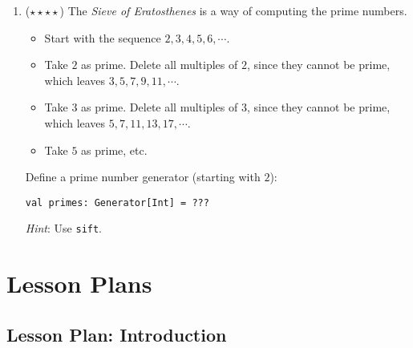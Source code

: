 \documentclass[9pt]{extbook}
\begin{document}
\begin{enumerate}
\item ($\star\star\star\star$) The \emph{Sieve of Eratosthenes} is a way of computing the prime numbers.

\begin{itemize}

\item Start with the sequence $2, 3, 4, 5, 6, \cdots$.

\item Take $2$ as prime. Delete all multiples of $2$, since they cannot be prime, which leaves $3, 5, 7, 9, 11, \cdots$.

\item Take $3$ as prime. Delete all multiples of $3$, since they cannot be prime, which leaves $5, 7, 11, 13, 17, \cdots$.

\item Take $5$ as prime, etc.

\end{itemize}

Define a prime number generator (starting with $2$):

\begin{lstlisting}
val primes: Generator[Int] = ???
\end{lstlisting}

\emph{Hint}: Use \lstinline|sift|.

\end{enumerate}



\part{Lesson Plans}

\chapter{Lesson Plan: Introduction}
\end{document}
